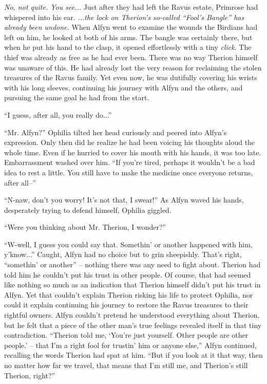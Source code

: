 \emph{No, not quite. You see...} Just after they had left the Ravus estate, Primrose had whispered into his ear. \emph{...the lock on Therion's so-called ``Fool's Bangle'' has already been undone.} When Alfyn went to examine the wounds the Birdians had left on him, he looked at both of his arms. The bangle was certainly there, but when he put his hand to the clasp, it opened effortlessly with a tiny \emph{click}. The thief was already as free as he had ever been. There was no way Therion himself was unaware of this. He had already lost the very reason for reclaiming the stolen treasures of the Ravus family. Yet even now, he was dutifully covering his wrists with his long sleeves, continuing his journey with Alfyn and the others, and pursuing the same goal he had from the start.

``I guess, after all, you really do...''

``Mr. Alfyn?'' Ophilia tilted her head curiously and peered into Alfyn's expression. Only then did he realize he had been voicing his thoughts aloud the whole time. Even if he hurried to cover his mouth with his hands, it was too late. Embarrassment washed over him. ``If you're tired, perhaps it wouldn't be a bad idea to rest a little. You still have to make the medicine once everyone returns, after all--''

``N-naw, don't you worry! It's not that, I swear!'' As Alfyn waved his hands, desperately trying to defend himself, Ophilia giggled. 

``Were you thinking about Mr. Therion, I wonder?''

``W-well, I guess you could say that. Somethin' or another happened with him, y'know...'' Caught, Alfyn had no choice but to grin sheepishly. That's right, ``somethin' or another'' -- nothing there was any need to fight about. Therion had told him he couldn't put his trust in other people. Of course, that had seemed like nothing so much as an indication that Therion himself didn't put his trust in Alfyn. Yet that couldn't explain Therion risking his life to protect Ophilia, nor could it explain continuing his journey to restore the Ravus treasures to their rightful owners. Alfyn couldn't pretend he understood everything about Therion, but he felt that a piece of the other man's true feelings revealed itself in that tiny contradiction. ``Therion told me, `You're just yourself. Other people are other people.' -- that I'm a right fool for trustin' him or anyone else,'' Alfyn continued, recalling the words Therion had spat at him. ``But if you look at it that way, then no matter how far we travel, that means that I'm still me, and Therion's still Therion, right?''

